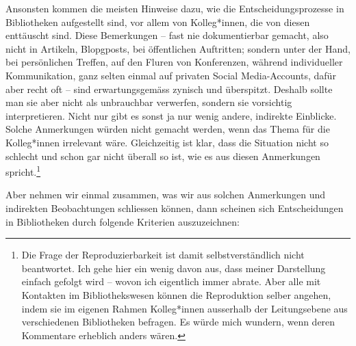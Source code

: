 \documentclass[a4paper,
fontsize=11pt,
oneside,
numbers=noperiodatend,
parskip=half-,
bibliography=totoc,
final
]{scrartcl}
\begin{document}
Ansonsten kommen die meisten Hinweise dazu, wie die
Entscheidungsprozesse in Bibliotheken aufgestellt sind, vor allem von
Kolleg*innen, die von diesen enttäuscht sind. Diese Bemerkungen -- fast
nie dokumentierbar gemacht, also nicht in Artikeln, Blopgposts, bei
öffentlichen Auftritten; sondern unter der Hand, bei persönlichen
Treffen, auf den Fluren von Konferenzen, während individueller
Kommunikation, ganz selten einmal auf privaten Social Media-Accounts,
dafür aber recht oft -- sind erwartungsgemäss zynisch und überspitzt.
Deshalb sollte man sie aber nicht als unbrauchbar verwerfen, sondern sie
vorsichtig interpretieren. Nicht nur gibt es sonst ja nur wenig andere,
indirekte Einblicke. Solche Anmerkungen würden nicht gemacht werden,
wenn das Thema für die Kolleg*innen irrelevant wäre. Gleichzeitig ist
klar, dass die Situation nicht so schlecht und schon gar nicht überall
so ist, wie es aus diesen Anmerkungen spricht.\footnote{Die Frage der
  Reproduzierbarkeit ist damit selbstverständlich nicht beantwortet. Ich
  gehe hier ein wenig davon aus, dass meiner Darstellung einfach gefolgt
  wird -- wovon ich eigentlich immer abrate. Aber alle mit Kontakten im
  Bibliothekswesen können die Reproduktion selber angehen, indem sie im
  eigenen Rahmen Kolleg*innen ausserhalb der Leitungsebene aus
  verschiedenen Bibliotheken befragen. Es würde mich wundern, wenn deren
  Kommentare erheblich anders wären.}

Aber nehmen wir einmal zusammen, was wir aus solchen Anmerkungen und
indirekten Beobachtungen schliessen können, dann scheinen sich
Entscheidungen in Bibliotheken durch folgende Kriterien auszuzeichnen:
\end{document}
